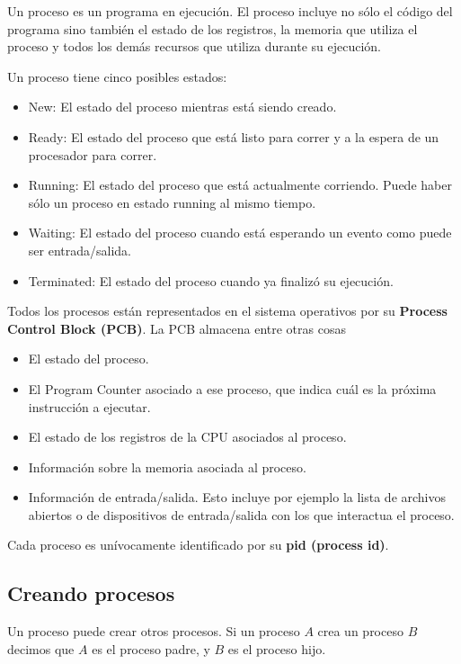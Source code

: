\documentclass{article}
\begin{document}
Un proceso es un programa en ejecuci\'on. El proceso incluye no s\'olo el c\'odigo del programa sino tambi\'en el estado de los registros, la memoria que utiliza el proceso y todos los dem\'as recursos que utiliza durante su ejecuci\'on.

Un proceso tiene cinco posibles estados:
\begin{itemize}
\item New: El estado del proceso mientras est\'a siendo creado.
\item Ready: El estado del proceso que est\'a listo para correr y a la espera de un procesador para correr.
\item Running: El estado del proceso que est\'a actualmente corriendo. Puede haber s\'olo un proceso en estado running al mismo tiempo.
\item Waiting: El estado del proceso cuando est\'a esperando un evento como puede ser entrada/salida.
\item Terminated: El estado del proceso cuando ya finaliz\'o su ejecuci\'on.
\end{itemize}

Todos los procesos est\'an representados en el sistema operativos por su \textbf{Process Control Block (PCB)}. La PCB almacena entre otras cosas
\begin{itemize}
\item El estado del proceso.
\item El Program Counter asociado a ese proceso, que indica cu\'al es la pr\'oxima instrucci\'on a ejecutar.
\item El estado de los registros de la CPU asociados al proceso.
\item Informaci\'on sobre la memoria asociada al proceso.
\item Informaci\'on de entrada/salida. Esto incluye por ejemplo la lista de archivos abiertos o de dispositivos de entrada/salida con los que interactua el proceso.
\end{itemize}

Cada proceso es un\'ivocamente identificado por su \textbf{pid (process id)}.

\subsection{Creando procesos}

Un proceso puede crear otros procesos. Si un proceso $A$ crea un proceso $B$ decimos que $A$ es el proceso padre, y $B$ es el proceso hijo.
\end{document}
